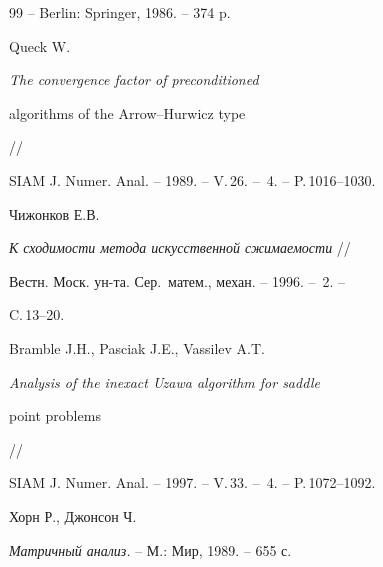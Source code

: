 \begin{thebibliography}{99}
-- Berlin: Springer, 1986. -- 374 p.




Queck W.


{\em The convergence factor of preconditioned


algorithms of the Arrow--Hurwicz type} //


SIAM J. Numer. Anal. -- 1989. -- V.\,26. -- \No\,4. -- P.\,1016--1030.




Чижонков Е.В.


{\em К сходимости метода искусственной сжимаемости} //


Вестн. Моск. ун-та. Сер.~матем., механ. -- 1996. -- \No\,2. --


C.\,13--20.




Bramble J.H., Pasciak J.E., Vassilev A.T.


{\em Analysis of the inexact Uzawa algorithm for saddle


point problems} //


SIAM J. Numer. Anal. -- 1997. -- V.\,33. -- \No\,4. -- P.\,1072--1092.




Хорн Р., Джонсон Ч.


{\em Матричный анализ.} -- М.: Мир, 1989. -- 655 с.





\end{thebibliography}





\vskip 2cm












\label{end}





